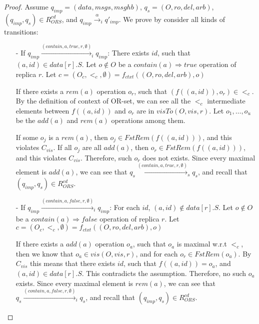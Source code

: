 \begin {proof}

Assume $q_{\mathit{imp}} = (\mathit{data},\mathit{msgs},\mathit{msghb})$, $q_s = (O,\mathit{ro},\mathit{del},\mathit{arb})$, $(q_{\mathit{imp}},q_s) \in R_{\mathit{ORS}}^{\mathit{cd}}$, and $q_{\mathit{imp}} \xrightarrow{\alpha}_i q'_{\mathit{imp}}$. We prove by consider all kinds of transitions:

\begin{itemize}
\setlength{\itemsep}{0.5pt}
\item[-] If $q_{\mathit{imp}} \xrightarrow{( \mathit{contain},a,\mathit{true},r,\emptyset )}_i q_{\mathit{imp}}$: There exists $\mathit{id}$, such that $(a,id) \in \mathit{data}[r].S$. Let $o \notin O$ be a $\mathit{contain}(a) \Rightarrow \mathit{true}$ operation of replica $r$. Let $c = (O_c,<_c,\emptyset) = f_{\mathit{ctxt}}((O,\mathit{ro},\mathit{del},\mathit{arb}),o)$

If there exists a $\mathit{rem}(a)$ operation $o_r$, such that $(f((a,\mathit{id})),o_r) \in <_c$. By the definition of context of OR-set, we can see all the $<_c$ intermediate elements between $f((a,\mathit{id}))$ and $o_r$ are in $\mathit{visTo}(O,\mathit{vis},r)$. Let $o_1,\ldots,o_u$ be the $\mathit{add}(a)$ and $\mathit{rem}(a)$ operations among them.

If some $o_j$ is a $\mathit{rem}(a)$, then $o_j \in \mathit{FstRem}( f((a,\mathit{id})) )$, and this violates $C_{\mathit{vis}}$. If all $o_j$ are all $\mathit{add}(a)$, then $o_r \in \mathit{FstRem}( f((a,\mathit{id})) )$, and this violates $C_{\mathit{vis}}$. Therefore, such $o_r$ does not exists. Since every maximal element is $\mathit{add}(a)$, we can see that $q_s \xrightarrow{( \mathit{contain},a,\mathit{true},r,\emptyset )}_s q_s$, and recall that $(q_{\mathit{imp}},q_s) \in R_{\mathit{ORS}}^{\mathit{cd}}$.

\item[-] If $q_{\mathit{imp}} \xrightarrow{( \mathit{contain},a,\mathit{false},r,\emptyset )}_i q_{\mathit{imp}}$: For each $\mathit{id}$, $(a,id) \notin \mathit{data}[r].S$. Let $o \notin O$ be a $\mathit{contain}(a) \Rightarrow \mathit{false}$ operation of replica $r$. Let $c = (O_c,<_c,\emptyset) = f_{\mathit{ctxt}}((O,\mathit{ro},\mathit{del},\mathit{arb}),o)$

If there exists a $\mathit{add}(a)$ operation $o_a$, such that $o_a$ is maximal w.r.t $<_c$, then we know that $o_a \in \mathit{vis}(O,\mathit{vis},r)$, and for each $o_r \in \mathit{FstRem}(o_a)$. By $C_{\mathit{vis}}$ this means that there exists $\mathit{id}$, such that $f((a,\mathit{id})) = o_a$, and $(a,\mathit{id}) \in \mathit{data}[r].S$. This contradicts the assumption. Therefore, no such $o_a$ exists. Since every  maximal element is $\mathit{rem}(a)$, we can see that $q_s \xrightarrow{( \mathit{contain},a,\mathit{false},r,\emptyset )}_i q_s$, and recall that $(q_{\mathit{imp}},q_s) \in R_{\mathit{ORS}}^{\mathit{cd}}$.


\end{itemize}
\end{proof}
